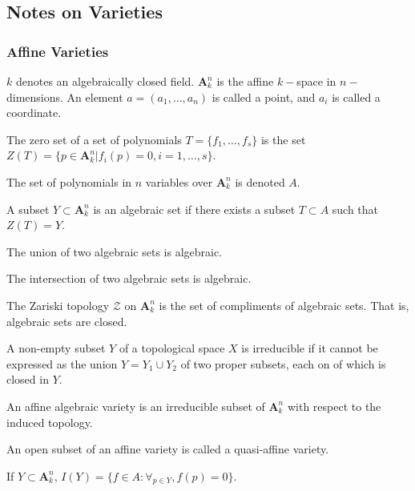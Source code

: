 \documentclass[crop=false,class=book,oneside]{standalone}
\begin{document}
\subsection{Notes on Varieties}
\subsubsection{Affine Varieties}
$k$ denotes an algebraically closed field. $\textbf{A}_{k}^n$ is the affine $k-$space in $n-$dimensions. An element $a=(a_1,\hdots, a_n)$ is called a point, and $a_i$ is called a coordinate.
\begin{definition}
The zero set of a set of polynomials $T = \{f_1,\hdots, f_s\}$ is the set $Z(T) = \{p\in \textbf{A}_k^n|f_i(p) = 0,i=1,\hdots, s\}$.
\end{definition}
\begin{notation}
The set of polynomials in $n$ variables over $\textbf{A}_k^n$ is denoted $A$.
\end{notation}
\begin{definition}
A subset $Y\subset \textbf{A}_k^n$ is an algebraic set if there exists a subset $T\subset A$ such that $Z(T) = Y$.
\end{definition}
\begin{theorem}
The union of two algebraic sets is algebraic.
\end{theorem}
\begin{theorem}
The intersection of two algebraic sets is algebraic.
\end{theorem}
\begin{definition}
The Zariski topology $\mathcal{Z}$ on $\textbf{A}_{k}^n$ is the set of compliments of algebraic sets. That is, algebraic sets are closed.
\end{definition}
\begin{definition}
A non-empty subset $Y$ of a topological space $X$ is irreducible if it cannot be expressed as the union $Y=Y_1\cup Y_2$ of two proper subsets, each on of which is closed in $Y$.
\end{definition}
\begin{definition}
An affine algebraic variety is an irreducible subset of $\textbf{A}_k^n$ with respect to the induced topology.
\end{definition}
\begin{definition}
An open subset of an affine variety is called a quasi-affine variety.
\end{definition}
\begin{notation}
If $Y\subset \textbf{A}_k^n$, $I(Y) = \{f\in A:\forall_{p\in Y}, f(p) = 0\}$.
\end{notation}
\end{document}
